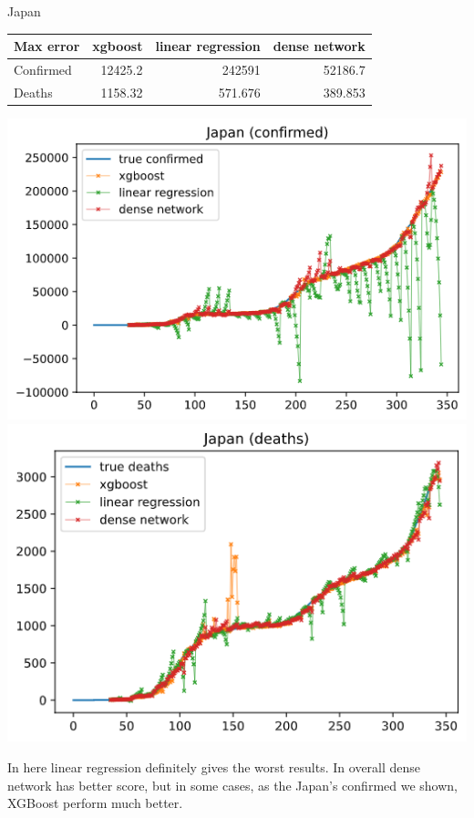 \documentclass[a4paper,12pt]{article}
\begin{document}
\begin{tcolorbox}
    Japan
    
    \begin{tabular}{lrrr}
    \toprule
    Max error   &   xgboost &   linear regression &   dense network \\
    \midrule
    Confirmed   &  12425.2  &          242591     &       52186.7   \\
    Deaths      &   1158.32 &             571.676 &         389.853 \\
    \bottomrule
    \end{tabular}
    \begin{center}
        \includegraphics[width=\textwidth]{Japan_2-1.png}
        \includegraphics[width=\textwidth]{Japan_2-2.png}
    \end{center}
\end{tcolorbox}
In here linear regression definitely gives the worst results. In overall dense network has better score, but in some cases, as the Japan's confirmed we shown, XGBoost perform much better.
\end{document}
